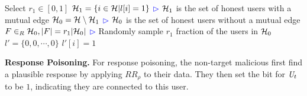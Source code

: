%  
%

\begin{algorithm}[bt]
Select $r_1\in [0,1]$\;
$\mathcal{H}_1=\{i \in \mathcal{H}| l[i]=1\}$\;
\hfill\textcolor{blue}{$\rhd$} $\mathcal{H}_1$ is the set of honest users with a mutual edge\;
$\mathcal{H}_0=\mathcal{H}\setminus\mathcal{H}_1$\;
\hfill\textcolor{blue}{$\rhd$} $\mathcal{H}_0$ is the set of honest users without a mutual edge\;
$F\in_R \mathcal{H}_0, |F|=r_1|\mathcal{H}_0|$\;
\hfill\textcolor{blue}{$\rhd$} Randomly sample $r_1$ fraction of the users in $\mathcal{H}_0$\;
$l'=\{0,0,\cdots, 0\}$\;
 {
$l'[i]=1$ \;
}
  \caption{$A_{\DegRRCheck}^{inp}: \{0,1\}^n\mapsto\{0,1\}^n$ }\label{chap4-alg:att-input-inf}
\end{algorithm}
\noindent \textbf{Response Poisoning.}  For response poisoning, the non-target malicious first find a plausible response by applying $RR_\rho$ to their data. They then set the bit for $\textit{U}_t$ to be $1$, indicating they are connected to this user.


